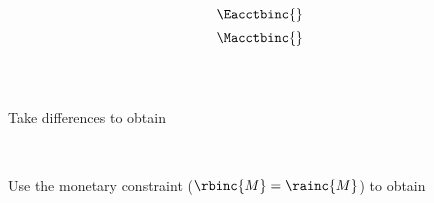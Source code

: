 

\begin{landscape}

\linespread{1}


\sectionsep{}

{
  \begin{equation}
  \Eacctbinc{}
  \end{equation}
}
{
  \begin{equation}
  \Macctbinc{}
  \end{equation}
}

\sectionsep{}

{
  \begin{equation}
  \end{equation}
}
{
  \begin{equation}
  \end{equation}
}

\sectionsep{}

\derivsection{}
{
  ~

  Take differences to obtain

}
{
  ~

  Use the monetary constraint ($\rbinc{M} = \rainc{M}$) to obtain
}
\end{landscape}